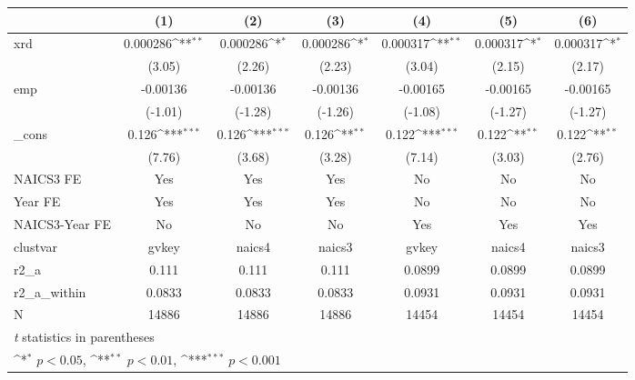 {
\def\sym#1{\ifmmode^{#1}\else\(^{#1}\)\fi}
\begin{tabular}{l*{6}{c}}
\hline\hline
            &\multicolumn{1}{c}{(1)}         &\multicolumn{1}{c}{(2)}         &\multicolumn{1}{c}{(3)}         &\multicolumn{1}{c}{(4)}         &\multicolumn{1}{c}{(5)}         &\multicolumn{1}{c}{(6)}         \\
\hline
xrd         &    0.000286\sym{**} &    0.000286\sym{*}  &    0.000286\sym{*}  &    0.000317\sym{**} &    0.000317\sym{*}  &    0.000317\sym{*}  \\
            &      (3.05)         &      (2.26)         &      (2.23)         &      (3.04)         &      (2.15)         &      (2.17)         \\
[1em]
emp         &    -0.00136         &    -0.00136         &    -0.00136         &    -0.00165         &    -0.00165         &    -0.00165         \\
            &     (-1.01)         &     (-1.28)         &     (-1.26)         &     (-1.08)         &     (-1.27)         &     (-1.27)         \\
[1em]
\_cons      &       0.126\sym{***}&       0.126\sym{***}&       0.126\sym{**} &       0.122\sym{***}&       0.122\sym{**} &       0.122\sym{**} \\
            &      (7.76)         &      (3.68)         &      (3.28)         &      (7.14)         &      (3.03)         &      (2.76)         \\
[1em]
NAICS3 FE   &         Yes         &         Yes         &         Yes         &          No         &          No         &          No         \\
[1em]
Year FE     &         Yes         &         Yes         &         Yes         &          No         &          No         &          No         \\
[1em]
NAICS3-Year FE&          No         &          No         &          No         &         Yes         &         Yes         &         Yes         \\
\hline
clustvar    &       gvkey         &      naics4         &      naics3         &       gvkey         &      naics4         &      naics3         \\
r2\_a        &       0.111         &       0.111         &       0.111         &      0.0899         &      0.0899         &      0.0899         \\
r2\_a\_within &      0.0833         &      0.0833         &      0.0833         &      0.0931         &      0.0931         &      0.0931         \\
N           &       14886         &       14886         &       14886         &       14454         &       14454         &       14454         \\
\hline\hline
\multicolumn{7}{l}{\footnotesize \textit{t} statistics in parentheses}\\
\multicolumn{7}{l}{\footnotesize \sym{*} \(p<0.05\), \sym{**} \(p<0.01\), \sym{***} \(p<0.001\)}\\
\end{tabular}
}
